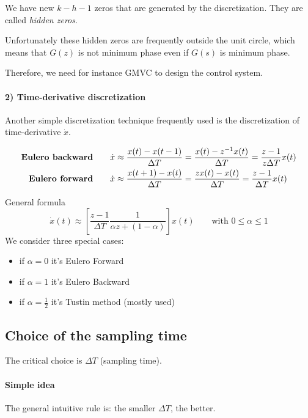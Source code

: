 \begin{appendices}
\begin{rem}[$s$-domain]
    We have new $k-h-1$ zeros that are generated by the discretization.
    They are called \emph{hidden zeros}.

    Unfortunately these hidden zeros are frequently outside the unit circle, which means that $G(z)$ is not minimum phase even if $G(s)$ is minimum phase.

    Therefore, we need for instance GMVC to design the control system.
\end{rem}

\paragraph{2) Time-derivative discretization}

Another simple discretization technique frequently used is the discretization of time-derivative $\dot{x}$.

\begin{align*}
    \text{\textbf{Eulero backward}} &\qquad \dot{x} \approx \frac{x(t)-x(t-1)}{\Delta T} = \frac{x(t)-z^{-1}x(t)}{\Delta T} = \frac{z-1}{z\Delta T} x(t) \\
    \text{\textbf{Eulero forward}} &\qquad \dot{x} \approx \frac{x(t+1)-x(t)}{\Delta T} = \frac{zx(t)-x(t)}{\Delta T} = \frac{z-1}{\Delta T} x(t)
\end{align*}

General formula
\[
    \dot{x}(t) \approx \left[ \frac{z-1}{\Delta T} \frac{1}{\alpha z + (1-\alpha)} \right]x(t) \qquad \text{with } 0 \le \alpha \le 1
\]
We consider three special cases:
\begin{itemize}
    \item if $\alpha = 0$ it's Eulero Forward
    \item if $\alpha = 1$ it's Eulero Backward
    \item if $\alpha = \frac{1}{2}$ it's Tustin method (mostly used)
\end{itemize}

\subsection*{Choice of the sampling time}

The critical choice is $\Delta T$ (sampling time).

\paragraph{Simple idea}
The general intuitive rule is: the smaller $\Delta T$, the better.


\end{appendices}
